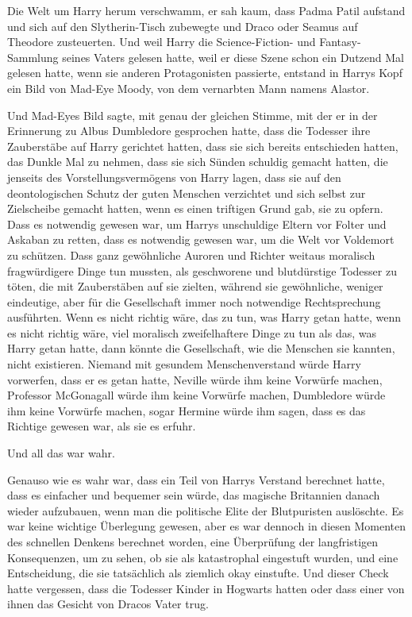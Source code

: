 {Die Welt um Harry herum verschwamm, er sah kaum, dass Padma Patil aufstand und sich auf den Slytherin-Tisch zubewegte und Draco oder Seamus auf Theodore zusteuerten. Und weil Harry die Science-Fiction- und Fantasy-Sammlung seines Vaters gelesen hatte, weil er diese Szene schon ein Dutzend Mal gelesen hatte, wenn sie anderen Protagonisten passierte, entstand in Harrys Kopf ein Bild von Mad-Eye Moody, von dem vernarbten Mann namens Alastor.

Und Mad-Eyes Bild sagte, mit genau der gleichen Stimme, mit der er in der Erinnerung zu Albus Dumbledore gesprochen hatte, dass die Todesser ihre Zauberstäbe auf Harry gerichtet hatten, dass sie sich bereits entschieden hatten, das Dunkle Mal zu nehmen, dass sie sich Sünden schuldig gemacht hatten, die jenseits des Vorstellungsvermögens von Harry lagen, dass sie auf den deontologischen Schutz der guten Menschen verzichtet und sich selbst zur Zielscheibe gemacht hatten, wenn es einen triftigen Grund gab, sie zu opfern. Dass es notwendig gewesen war, um Harrys unschuldige Eltern vor Folter und Askaban zu retten, dass es notwendig gewesen war, um die Welt vor Voldemort zu schützen. Dass ganz gewöhnliche Auroren und Richter weitaus moralisch fragwürdigere Dinge tun mussten, als geschworene und blutdürstige Todesser zu töten, die mit Zauberstäben auf sie zielten, während sie gewöhnliche, weniger eindeutige, aber für die Gesellschaft immer noch notwendige Rechtsprechung ausführten. Wenn es nicht richtig wäre, das zu tun, was Harry getan hatte, wenn es nicht richtig wäre, viel moralisch zweifelhaftere Dinge zu tun als das, was Harry getan hatte, dann könnte die Gesellschaft, wie die Menschen sie kannten, nicht existieren. Niemand mit gesundem Menschenverstand würde Harry vorwerfen, dass er es getan hatte, Neville würde ihm keine Vorwürfe machen, Professor McGonagall würde ihm keine Vorwürfe machen, Dumbledore würde ihm keine Vorwürfe machen, sogar Hermine würde ihm sagen, dass es das Richtige gewesen war, als sie es erfuhr.

Und all das war wahr.

Genauso wie es wahr war, dass ein Teil von Harrys Verstand berechnet hatte, dass es einfacher und bequemer sein würde, das magische Britannien danach wieder aufzubauen, wenn man die politische Elite der Blutpuristen auslöschte. Es war keine wichtige Überlegung gewesen, aber es war dennoch in diesen Momenten des schnellen Denkens berechnet worden, eine Überprüfung der langfristigen Konsequenzen, um zu sehen, ob sie als katastrophal eingestuft wurden, und eine Entscheidung, die sie tatsächlich als ziemlich okay einstufte. Und dieser Check hatte vergessen, dass die Todesser Kinder in Hogwarts hatten oder dass einer von ihnen das Gesicht von Dracos Vater trug.

}
